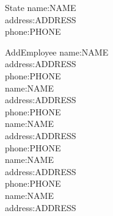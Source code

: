 \documentclass[10pt]{article}
\begin{document}
\begin{schema}{State}
     name:NAME                                                                                      \\
     address:ADDRESS                                                                                \\
     phone:PHONE                                                                                    \\
\end{schema}

\begin{schema}{AddEmployee}
     name:NAME                                                                                      \\
     address:ADDRESS                                                                                \\
     phone:PHONE                                                                                    \\
     name:NAME                                                                                      \\
     address:ADDRESS                                                                                \\
     phone:PHONE                                                                                    \\
     name:NAME                                                                                      \\
     address:ADDRESS                                                                                \\
     phone:PHONE                                                                                    \\
     name:NAME                                                                                      \\
     address:ADDRESS                                                                                \\
     phone:PHONE                                                                                    \\
     name:NAME                                                                                      \\
     address:ADDRESS                                                                                \\

\end{schema}
\end{document}

